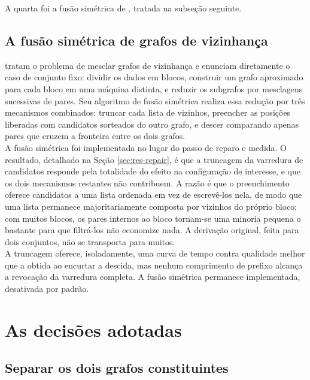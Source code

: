 A quarta foi a fusão simétrica de , tratada na subseção seguinte.\\

\subsection{A fusão simétrica de grafos de vizinhança\label{sec:discarded-smerge}}

 tratam o problema de mesclar grafos de vizinhança e enunciam diretamente o caso de conjunto fixo: dividir os dados em blocos, construir um grafo aproximado para cada bloco em uma máquina distinta, e reduzir os subgrafos por mesclagens sucessivas de pares. Seu algoritmo de fusão simétrica realiza essa redução por três mecanismos combinados: truncar cada lista de vizinhos, preencher as posições liberadas com candidatos sorteados do outro grafo, e descer comparando apenas pares que cruzem a fronteira entre os dois grafos.\\

A fusão simétrica foi implementada no lugar do passo de reparo e medida. O resultado, detalhado na Seção \ref{sec:res-repair}, é que a truncagem da varredura de candidatos responde pela totalidade do efeito na configuração de interesse, e que os dois mecanismos restantes não contribuem. A razão é que o preenchimento oferece candidatos a uma lista ordenada em vez de escrevê-los nela, de modo que uma lista permanece majoritariamente composta por vizinhos do próprio bloco; com muitos blocos, os pares internos ao bloco tornam-se uma minoria pequena o bastante para que filtrá-los não economize nada. A derivação original, feita para dois conjuntos, não se transporta para muitos.\\

A truncagem oferece, isoladamente, uma curva de tempo contra qualidade melhor que a obtida ao encurtar a descida, mas nenhum comprimento de prefixo alcança a revocação da varredura completa. A fusão simétrica permanece implementada, desativada por padrão.\\

\section{As decisões adotadas\label{sec:adopted}}

\subsection{Separar os dois grafos constituintes\label{sec:adopted-separation}}

